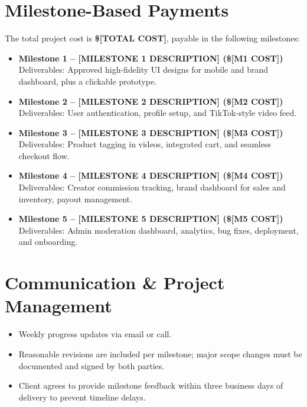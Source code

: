 \documentclass[11pt,letterpaper]{article}
\newcommand{\TotalCost}{[TOTAL COST]}
\newcommand{\MilestoneOne}{[MILESTONE 1 DESCRIPTION]}
\newcommand{\MOneCost}{[M1 COST]}
\newcommand{\MilestoneTwo}{[MILESTONE 2 DESCRIPTION]}
\newcommand{\MTwoCost}{[M2 COST]}
\newcommand{\MilestoneThree}{[MILESTONE 3 DESCRIPTION]}
\newcommand{\MThreeCost}{[M3 COST]}
\newcommand{\MilestoneFour}{[MILESTONE 4 DESCRIPTION]}
\newcommand{\MFourCost}{[M4 COST]}
\newcommand{\MilestoneFive}{[MILESTONE 5 DESCRIPTION]}
\newcommand{\MFiveCost}{[M5 COST]}
\begin{document}
\section{Milestone-Based Payments}
The total project cost is \textbf{\$\TotalCost{}}, payable in the following milestones:

\begin{itemize}[leftmargin=*]
\item \textbf{Milestone 1 -- \MilestoneOne{} (\$\MOneCost{})}\\
Deliverables: Approved high-fidelity UI designs for mobile and brand dashboard, plus a clickable prototype.

\item \textbf{Milestone 2 -- \MilestoneTwo{} (\$\MTwoCost{})}\\
Deliverables: User authentication, profile setup, and TikTok-style video feed.

\item \textbf{Milestone 3 -- \MilestoneThree{} (\$\MThreeCost{})}\\
Deliverables: Product tagging in videos, integrated cart, and seamless checkout flow.

\item \textbf{Milestone 4 -- \MilestoneFour{} (\$\MFourCost{})}\\
Deliverables: Creator commission tracking, brand dashboard for sales and inventory, payout management.

\item \textbf{Milestone 5 -- \MilestoneFive{} (\$\MFiveCost{})}\\
Deliverables: Admin moderation dashboard, analytics, bug fixes, deployment, and onboarding.
\end{itemize}

\section{Communication \& Project Management}
\begin{itemize}[leftmargin=*]
\item Weekly progress updates via email or call.
\item Reasonable revisions are included per milestone; major scope changes must be documented and signed by both parties.
\item Client agrees to provide milestone feedback within three business days of delivery to prevent timeline delays.
\end{itemize}
\end{document}
